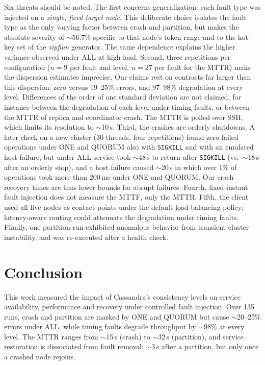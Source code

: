 \documentclass[runningheads]{llncs}
\begin{document}
Six threats should be noted. The first concerns generalization: each fault type
was injected on a \emph{single, fixed target node}. This deliberate choice
isolates the fault type as the only varying factor between crash and partition,
but makes the absolute severity of $\sim$56.7\% specific to that node's token
range and to the hot-key set of the \emph{zipfian} generator. The same dependence
explains the higher variance observed under ALL at high load. Second, three
repetitions per configuration ($n=9$ per fault and level, $n=27$ per fault for
the MTTR) make the dispersion estimates imprecise. Our claims rest on contrasts
far larger than this dispersion: zero versus 19--25\% errors, and 97--98\%
degradation at every level. Differences of the order of one standard deviation
are not claimed, for instance between the degradation of each level under timing
faults, or between the MTTR of replica and coordinator crash. The MTTR is polled
over SSH, which limits its resolution to $\sim$10\,s. Third, the crashes are
orderly shutdowns. A later check on a new cluster (30 threads, four repetitions)
found zero failed operations under ONE and QUORUM also with \texttt{SIGKILL} and
with an emulated host failure; but under ALL service took $\sim$48\,s to return
after \texttt{SIGKILL} (vs.\ $\sim$18\,s after an orderly stop), and a host
failure caused $\sim$20\,s in which over 1\% of operations took more than
200\,ms under ONE and QUORUM. Our
crash recovery times are thus lower bounds for abrupt failures. Fourth,
fixed-instant fault injection does not measure the MTTF, only the MTTR. Fifth, the client used all five nodes as
contact points under the default load-balancing policy; latency-aware routing
could attenuate the degradation under timing faults. Finally, one partition run
exhibited anomalous behavior from transient cluster instability, and was
re-executed after a health check.

\section{Conclusion}
\label{sec:conclusion}

This work measured the impact of Cassandra's consistency levels on service
availability, performance and recovery under controlled fault injection. Over
135 runs, crash and partition are masked by ONE and QUORUM but cause
$\sim$20--25\% errors under ALL, while timing faults degrade throughput by
$\sim$98\% at every level. The MTTR ranges from $\sim$15\,s (crash) to
$\sim$32\,s (partition), and service restoration is dissociated from fault
removal: $\sim$3\,s after a partition, but only once a crashed node rejoins.
\end{document}
